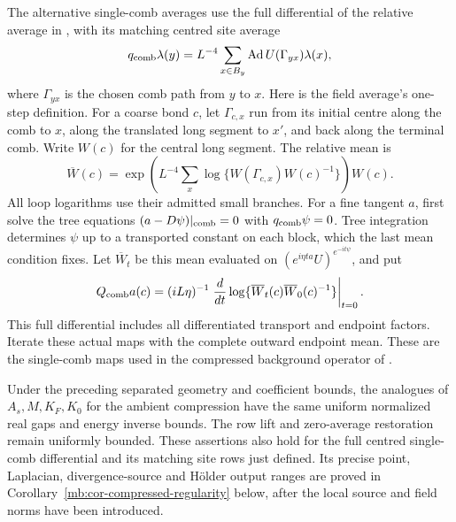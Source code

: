 \documentclass[11pt,letterpaper,reqno]{amsart}
\makeatletter
\numberwithin{equation}{section}
\theoremstyle{definition}
\newcommand{\ms@minorstart}{%
  \pushQED{\qed}\renewcommand{\qedsymbol}{$\blacksquare$}}
\newenvironment{proposition}[1][]{\ms@minorstart\ms@proposition[#1]}
  {\popQED\endms@proposition}
\theoremstyle{remark}
\makeatother
\begin{document}
The alternative single-comb averages use the full differential
of the relative average in \cite[eqs.~(89)--(92), (124)]{Bal85a},
with its matching centred site average
\[
 q_{\rm comb}\lambda(y)
     =L^{-4}\sum_{x\in B_y}
             \operatorname{Ad}U(\Gamma_{yx})\lambda(x),
\]
where $\Gamma_{yx}$ is the chosen comb path from $y$ to $x$.
Here is the field average's one-step definition. For a coarse bond $c$, let $\Gamma_{c,x}$ run
from its initial centre along the comb to $x$, along the
translated long segment to $x'$, and back along the terminal
comb. Write $W(c)$ for the central long segment. The relative
mean is
\[
 \overline W(c)=
 \exp\!\left(L^{-4}\sum_x
       \log\{W(\Gamma_{c,x})W(c)^{-1}\}\right)W(c).
\]
All loop logarithms use their admitted small branches.
For a fine tangent $a$, first solve the tree equations
$(a-D\psi)|_{\rm comb}=0$ with $q_{\rm comb}\psi=0$.
Tree integration determines $\psi$ up to a transported
constant on each block, which the last mean condition fixes.
Let $\overline W_t$ be this mean evaluated on
$(e^{i\eta ta}U)^{e^{-it\psi}}$, and put
\[
 Q_{\rm comb}a(c)=(iL\eta)^{-1}
    \left.\frac{d}{dt}\log\{
          \overline W_t(c)\overline W_0(c)^{-1}\}\right|_{t=0}.
\]
This full differential includes all differentiated transport
and endpoint factors. Iterate these actual maps
with the complete outward endpoint mean. These are the
single-comb maps used in the compressed background operator
of \cite[pp.~392--394, eqs.~(3.13)--(3.19)]{Bal85p}.

\begin{proposition}[The compressed zero-current estimates]
\label{mb:prop-compressed-gap}
Under the preceding separated geometry and coefficient bounds,
the analogues of \(A_s,M,K_F,K_0\) for the ambient compression
have the same uniform normalized real gaps and energy
inverse bounds. The row lift and zero-average restoration
remain uniformly bounded. These assertions also hold for
the full centred single-comb differential and its matching
site rows just defined. Its precise point, Laplacian,
divergence-source and H\"older output ranges are proved in
Corollary~\ref{mb:cor-compressed-regularity} below, after
the local source and field norms have been introduced.
\end{proposition}
\end{document}
